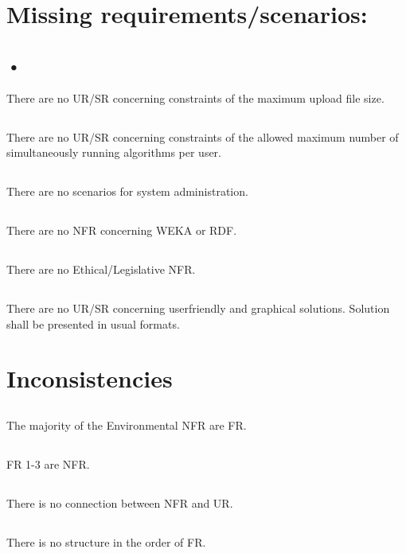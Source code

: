 \documentclass{article}
\begin{document}
\section{Missing requirements/scenarios:}

\subsection{•}
There are no UR/SR concerning constraints of the maximum upload file size.
\subsection{}
There are no UR/SR concerning constraints of the allowed maximum number of simultaneously running algorithms per user.
\subsection{}
There are no scenarios for system administration.
\subsection{}
There are no NFR concerning WEKA or RDF.
\subsection{}
There are no Ethical/Legislative NFR.
\subsection{}
There are no UR/SR concerning userfriendly and graphical solutions. Solution shall be presented in usual formats.
\subsection{}

\section{Inconsistencies}

\subsection{}
The majority of the Environmental NFR are FR.
\subsection{}
FR 1-3 are NFR.
\subsection{}
There is no connection between NFR and UR.
\subsection{}
There is no structure in the order of FR.

 
\end{document}
